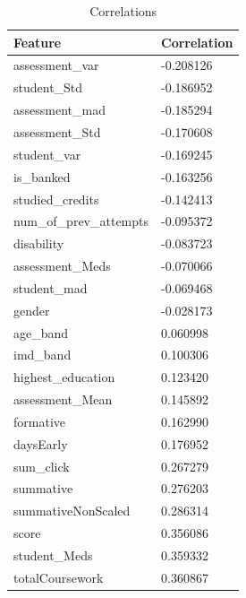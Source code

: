 \documentclass[11pt, a4paper, twocolumn]{article}
\begin{document}
\begin{table}[H]
	\centering
	\begin{tabular}{|l|l|}
		\hline
		Feature                    & Correlation \\ \hline
		assessment\_var              & -0.208126 \\ \hline
		student\_Std                 & -0.186952 \\ \hline
		assessment\_mad              & -0.185294 \\ \hline
		assessment\_Std              & -0.170608 \\ \hline
		student\_var                 & -0.169245 \\ \hline
		is\_banked                   & -0.163256 \\ \hline
		studied\_credits             & -0.142413 \\ \hline
		num\_of\_prev\_attempts      & -0.095372 \\ \hline
		disability                   & -0.083723 \\ \hline
		assessment\_Meds             & -0.070066 \\ \hline
		student\_mad                 & -0.069468 \\ \hline
		gender                       & -0.028173 \\ \hline
		age\_band                    & 0.060998  \\ \hline
		imd\_band                    & 0.100306  \\ \hline
		highest\_education           & 0.123420  \\ \hline
		assessment\_Mean             & 0.145892  \\ \hline
		formative                    & 0.162990  \\ \hline
		daysEarly                    & 0.176952  \\ \hline
		sum\_click                   & 0.267279  \\ \hline
		summative                    & 0.276203  \\ \hline
		summativeNonScaled           & 0.286314  \\ \hline
		score                        & 0.356086  \\ \hline
		student\_Meds                & 0.359332  \\ \hline
		totalCoursework              & 0.360867  \\ \hline
		\end{tabular}
		\caption{Correlations}
		\label{table:Correlations}
\end{table}
\end{document}
